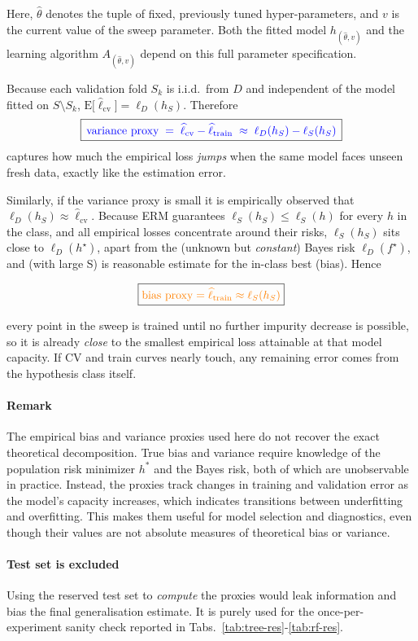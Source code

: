 \documentclass[12pt]{report}
\begin{document}
Here, $\hat\theta$ denotes the tuple of fixed, previously tuned hyper-parameters, 
and $v$ is the current value of the sweep parameter. Both the fitted model 
$h_{(\hat\theta, v)}$ and the learning algorithm $A_{(\hat\theta, v)}$ depend on this 
full parameter specification.

Because each validation fold $S_k$ is i.i.d.\ from $D$ and independent of the model 
fitted on $S\setminus S_k$, $\mathrm{E}\!\bigl[\widehat
\ell_{\text{cv}}\bigr]=\ell_D(h_S)$. Therefore
\[
  \boxed{\,%
  \color{blue}{\text{variance proxy}}
  \;=\;\widehat \ell_{\text{cv}}-\widehat \ell_{\text{train}}
  \;\approx\; \ell_D(h_S)-\ell_S(h_S)
  \,}
\]
captures how much the empirical loss \emph{jumps} when the same model faces unseen fresh
 data, exactly like the estimation error.

Similarly, if the variance proxy is small it is empirically observed that
$\ell_D(h_S)\approx\widehat \ell_{\text{cv}}$. Because ERM guarantees
$\ell_S(h_S)\le \ell_S(h)$ for every $h$ in the class, and all empirical losses 
concentrate around their risks, $\ell_S(h_S)$ sits close to $\ell_D(h^\star)$, apart from
the (unknown but \emph{constant}) Bayes risk $\ell_D(f^\star)$, and (with large S) is 
reasonable estimate for the in-class best (bias). Hence

\[
  \boxed{
  \color{orange}{\text{bias proxy}}
  =\widehat \ell_{\text{train}}
  \approx \ell_S(h_S) 
  }
\]

every point in the sweep is trained until no further impurity decrease is possible, 
so it is already \emph{close} to the smallest empirical loss attainable at that model 
capacity. If CV and train curves nearly touch, any remaining error comes from the 
hypothesis class itself.

\paragraph{Remark}
The empirical bias and variance proxies used here do not recover the exact theoretical 
decomposition. True bias and variance require knowledge of the population risk minimizer 
$h^{*}$ and the Bayes risk, both of which are unobservable in practice. Instead, the 
proxies track changes in training and validation error as the model's capacity increases, 
which indicates transitions between underfitting and overfitting. 
This makes them useful for model selection and diagnostics, even though their values are 
not absolute measures of theoretical bias or variance.

\paragraph{Test set is excluded}
Using the reserved test set to \emph{compute} the proxies would leak information
and bias the final generalisation estimate. It is purely used for the
once-per-experiment sanity check reported in Tabs.~\ref{tab:tree-res}-\ref{tab:rf-res}.
\end{document}
